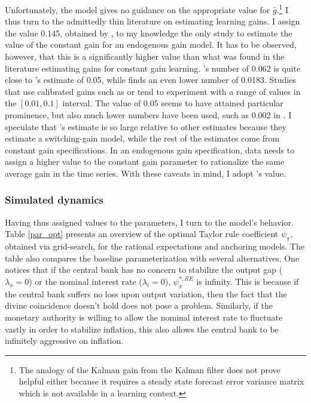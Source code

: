 \documentclass[11pt]{article}
\renewcommand{\[}{\begin{equation}}
\renewcommand{\]}{\end{equation}}
\begin{document}
Unfortunately, the model gives no guidance on the appropriate value for $\bar{g}$.\footnote{The analogy of the Kalman gain from the Kalman filter does not prove helpful either because it requires a steady state forecast error variance matrix which is not available in a learning context.} I thus turn to the admittedly thin literature on estimating learning gains. I assign the value  0.145, obtained by \cite{carvalho2019anchored}, to my knowledge the only study to estimate the value of the constant gain for an endogenous gain model. It has to be observed, however, that this is a significantly higher value than what was found in the literature estimating gains for constant gain learning. \cite{branch2006simple}'s number of 0.062 is quite close to \cite{eusepi2018limits}'s estimate of 0.05, while \cite{milani2007expectations} finds an even lower number of 0.0183. Studies that use calibrated gains such as \cite{williams2003adaptive} or \cite{orphanides2005decline} tend to experiment with a range of values in the $[0.01,0.1]$ interval. The value of 0.05 seems to have attained particular prominence, but also much lower numbers have been used, such as 0.002 in \cite{eusepi2011expectations}. I speculate that \cite{carvalho2019anchored}'s estimate is so large relative to other estimates because they estimate a switching-gain model, while the rest of the estimates come from constant gain specifications. In an endogenous gain specification, data needs to assign a higher value to the constant gain parameter to rationalize the same average gain in the time series. With these caveats in mind, I adopt \cite{carvalho2019anchored}'s value.

\subsubsection{Simulated dynamics}

Having thus assigned values to the parameters, I turn to the model's behavior. Table \ref{par_opt} presents an overview of the optimal Taylor rule coefficient $\psi_{\pi}$, obtained via grid-search, for the rational expectations and anchoring models. The table also compares the baseline parameterization with several alternatives. One notices that if the central bank has no concern to stabilize the output gap ($\lambda_x = 0$) or the nominal interest rate ($\lambda_i =0$), $\psi_{\pi}^{*,RE}$ is infinity. This is because if the central bank suffers no loss upon output variation, then the fact that the divine coincidence doesn't hold does not pose a problem. Similarly, if the monetary authority is willing to allow the nominal interest rate to fluctuate vastly in order to stabilize inflation, this also allows the central bank to be infinitely aggressive on inflation. 
\end{document}
